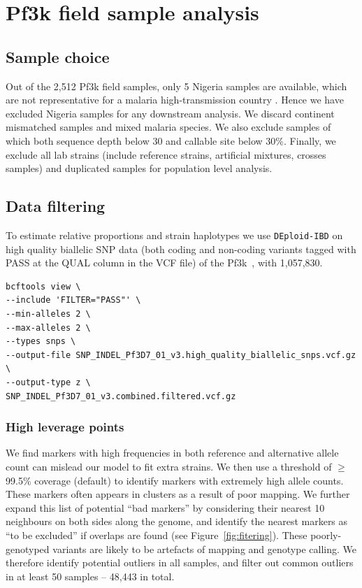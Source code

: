 \documentclass[9pt,lineno]{elife}
\begin{document}
\newpage

\section{Pf3k field sample analysis}
\subsection{Sample choice}
Out of the 2,512 Pf3k field samples, only 5 Nigeria samples are available, which are not representative for a malaria high-transmission country \citep{who2017profileNigeria}. Hence we have excluded Nigeria samples for any downstream analysis. We discard continent mismatched samples and mixed malaria species. We also exclude samples of which both sequence depth below 30 and callable site below 30\%. Finally, we exclude all lab strains (include reference strains, artificial mixtures, crosses samples) and duplicated samples for population level analysis.


\subsection{Data filtering}
To estimate relative proportions and strain haplotypes we use {\tt DEploid-IBD} on high quality biallelic SNP data (both coding and non-coding variants tagged with PASS at the QUAL column in the VCF file) of the Pf3k~\citep{pf3k}, with 1,057,830.
\linespread{1}
\begin{lstlisting}
bcftools view \
--include 'FILTER="PASS"' \
--min-alleles 2 \
--max-alleles 2 \
--types snps \
--output-file SNP_INDEL_Pf3D7_01_v3.high_quality_biallelic_snps.vcf.gz \
--output-type z \
SNP_INDEL_Pf3D7_01_v3.combined.filtered.vcf.gz
\end{lstlisting}

\subsubsection{High leverage points}

We find markers with high frequencies in both reference and alternative allele count can mislead our model to fit extra strains. We then use a threshold of $\geq$ 99.5\% coverage (default) to identify markers with extremely high allele counts. These markers often appears in clusters as a result of poor mapping. We further expand this list of potential ``bad markers'' by considering their nearest 10 neighbours on both sides along the genome, and identify the nearest markers as ``to be excluded'' if overlaps are found (see Figure~\ref{fig:fitering}). These poorly-genotyped variants are likely to be artefacts of mapping and genotype calling. We therefore identify potential outliers in all samples, and filter out common outliers in at least 50 samples -- 48,443 in total.
\end{document}
